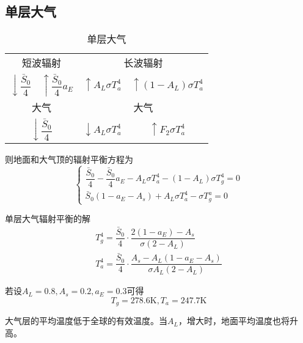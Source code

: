 \documentclass[UTF8,a4paper,11pt,oneside]{ctexbook}
\begin{document}
\subsection{单层大气}
\begin{table}[htbp]
    \centering
    \begin{tabular}{cc|cc}
        \multicolumn{2}{c|}{短波辐射}&\multicolumn{2}{c}{长波辐射}\\
        \(\downarrow \dfrac{\bar{S}_0}{4}\)&\(\uparrow \dfrac{\bar{S}_0}{4}a_E\)&\(\uparrow A_L\sigma{}T_a^4\)&\(\uparrow (1-A_L)\sigma{}T_a^4\)\\
        \hline
        \multicolumn{2}{c|}{大气}&\multicolumn{2}{c}{大气}\\
        \hline
        \multicolumn{2}{c|}{\(\downarrow \dfrac{\bar{S}_0}{4}\)}&\(\downarrow A_L\sigma{}T_a^4\)&\(\uparrow F_2\sigma{}T_a^4\)\\
        \hline
        \hline
    \end{tabular}
    \caption{单层大气}
\end{table}

则地面和大气顶的辐射平衡方程为
\begin{equation}
\begin{cases}
    \dfrac{\bar{S}_0}{4}-\dfrac{\bar{S}_0}{4}a_E-A_L\sigma{}T_a^4-(1-A_L)\sigma{}T_g^4=0\\
    \bar{S}_0(1-a_E-A_s)+A_L\sigma{}T_a^4-\sigma{}T_g^a=0
\end{cases}
\end{equation}

单层大气辐射平衡的解
\begin{gather}
    T_g^4=\dfrac{\bar{S}_0}{4}\cdot\dfrac{2(1-a_E)-A_s}{\sigma(2-A_L)}\\
    T_a^4=\dfrac{\bar{S}_0}{4}\cdot\dfrac{A_s-A_L(1-a_E-A_s)}{\sigma{}A_L(2-A_L)}
\end{gather}

若设\(A_L=0.8,A_s=0.2,a_E=0.3\)可得
\begin{equation}
T_g=278.6\mathrm{K},T_a=247.7\mathrm{K}
\end{equation}

大气层的平均温度低于全球的有效温度。当\(A_L\)，增大时，地面平均温度也将升高。
\end{document}
